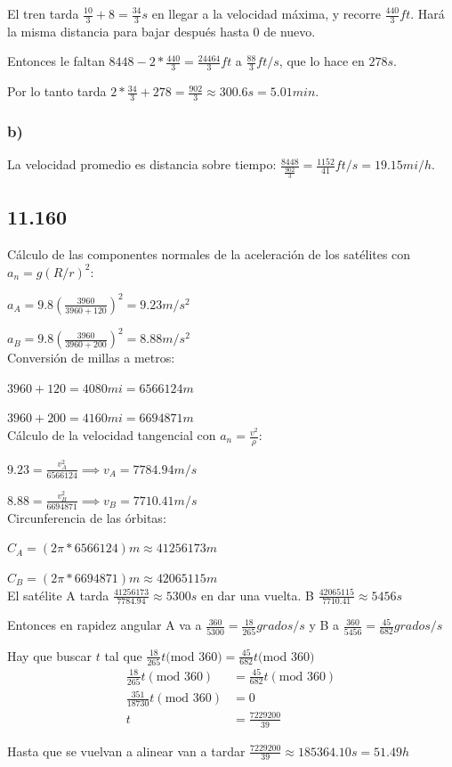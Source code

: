 \documentclass[12pt]{article}
\begin{document}
El tren tarda $\frac{10}{3}+8=\frac{34}{3}s$ en llegar a la velocidad máxima, y recorre $\frac{440}{3}ft$. Hará la misma distancia para bajar después hasta 0 de nuevo.

Entonces le faltan $8448-2*\frac{440}{3}=\frac{24464}{3}ft$ a $\frac{88}{3}ft/s$, que lo hace en $278s$.

Por lo tanto tarda $2*\frac{34}{3}+278=\frac{902}{3}\approx 300.6s=5.01min$.
\subsubsection*{b)}
La velocidad promedio es distancia sobre tiempo: $\frac{8448}{\frac{902}{3}}=\frac{1152}{41}ft/s=19.15mi/h$.
\newpage
\subsection*{11.160}
Cálculo de las componentes normales de la aceleración de los satélites con $a_n=g(R/r)^2$:

$a_A=9.8(\frac{3960}{3960+120})^2=9.23m/s^2$

$a_B=9.8(\frac{3960}{3960+200})^2=8.88m/s^2$\\

Conversión de millas a metros:

$3960+120=4080mi=6566124m$

$3960+200=4160mi=6694871m$\\

Cálculo de la velocidad tangencial con $a_n=\frac{v^2}{\rho}$:

$9.23=\frac{v_A^2}{6566124}\implies v_A=7784.94m/s$

$8.88=\frac{v_B^2}{6694871}\implies v_B=7710.41m/s$\\

Circunferencia de las órbitas:

$C_A=(2\pi*6566124)m\approx 41256173m$

$C_B=(2\pi*6694871)m\approx 42065115m$\\

El satélite A tarda $\frac{41256173}{7784.94}\approx 5300s$ en dar una vuelta. B $\frac{42065115}{7710.41}\approx 5456s$

Entonces en rapidez angular A va a $\frac{360}{5300}=\frac{18}{265} grados/s$ y B a $\frac{360}{5456}=\frac{45}{682} grados/s$

Hay que buscar $t$ tal que $\frac{18}{265}t($mod $360)=\frac{45}{682}t($mod $360)$
\begin{align*}
  \frac{18}{265}t(\textrm{mod }360)&=\frac{45}{682}t(\textrm{mod }360)\\
  \frac{351}{18730}t(\textrm{mod }360)&=0\\
  t&=\frac{7229200}{39}
\end{align*}

Hasta que se vuelvan a alinear van a tardar $\frac{7229200}{39}\approx 185364.10s=51.49h$
\end{document}
